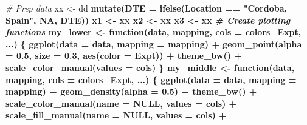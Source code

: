 \documentclass[
]{article}
\newenvironment{Shaded}{\begin{snugshade}}{\end{snugshade}}
\newcommand{\CommentTok}[1]{\textcolor[rgb]{0.56,0.35,0.01}{\textit{#1}}}
\newcommand{\ControlFlowTok}[1]{\textcolor[rgb]{0.13,0.29,0.53}{\textbf{#1}}}
\newcommand{\DataTypeTok}[1]{\textcolor[rgb]{0.13,0.29,0.53}{#1}}
\newcommand{\FloatTok}[1]{\textcolor[rgb]{0.00,0.00,0.81}{#1}}
\newcommand{\KeywordTok}[1]{\textcolor[rgb]{0.13,0.29,0.53}{\textbf{#1}}}
\newcommand{\NormalTok}[1]{#1}
\newcommand{\OperatorTok}[1]{\textcolor[rgb]{0.81,0.36,0.00}{\textbf{#1}}}
\newcommand{\OtherTok}[1]{\textcolor[rgb]{0.56,0.35,0.01}{#1}}
\newcommand{\StringTok}[1]{\textcolor[rgb]{0.31,0.60,0.02}{#1}}
\begin{document}
\begin{Shaded}
\begin{Highlighting}[]
\CommentTok{# Prep data}
\NormalTok{xx <-}\StringTok{ }\NormalTok{dd }\OperatorTok{%
\StringTok{  }\KeywordTok{mutate}\NormalTok{(}\DataTypeTok{DTE =} \KeywordTok{ifelse}\NormalTok{(Location }\OperatorTok{==}\StringTok{ "Cordoba, Spain"}\NormalTok{, }\OtherTok{NA}\NormalTok{, DTE))}
\NormalTok{x1 <-}\StringTok{ }\NormalTok{xx }\OperatorTok{%
\NormalTok{x2 <-}\StringTok{ }\NormalTok{xx }\OperatorTok{%
\NormalTok{x3 <-}\StringTok{ }\NormalTok{xx }\OperatorTok{%
\CommentTok{# Create plotting functions}
\NormalTok{my_lower <-}\StringTok{ }\ControlFlowTok{function}\NormalTok{(data, mapping, }\DataTypeTok{cols =}\NormalTok{ colors_Expt, ...) \{}
  \KeywordTok{ggplot}\NormalTok{(}\DataTypeTok{data =}\NormalTok{ data, }\DataTypeTok{mapping =}\NormalTok{ mapping) }\OperatorTok{+}
\StringTok{    }\KeywordTok{geom_point}\NormalTok{(}\DataTypeTok{alpha =} \FloatTok{0.5}\NormalTok{, }\DataTypeTok{size =} \FloatTok{0.3}\NormalTok{, }\KeywordTok{aes}\NormalTok{(}\DataTypeTok{color =}\NormalTok{ Expt)) }\OperatorTok{+}
\StringTok{    }\KeywordTok{theme_bw}\NormalTok{() }\OperatorTok{+}\StringTok{ }
\StringTok{    }\KeywordTok{scale_color_manual}\NormalTok{(}\DataTypeTok{values =}\NormalTok{ cols)}
\NormalTok{\}}
\NormalTok{my_middle <-}\StringTok{ }\ControlFlowTok{function}\NormalTok{(data, mapping, }\DataTypeTok{cols =}\NormalTok{ colors_Expt, ...) \{}
  \KeywordTok{ggplot}\NormalTok{(}\DataTypeTok{data =}\NormalTok{ data, }\DataTypeTok{mapping =}\NormalTok{ mapping) }\OperatorTok{+}\StringTok{ }
\StringTok{    }\KeywordTok{geom_density}\NormalTok{(}\DataTypeTok{alpha =} \FloatTok{0.5}\NormalTok{) }\OperatorTok{+}\StringTok{ }\KeywordTok{theme_bw}\NormalTok{() }\OperatorTok{+}
\StringTok{    }\KeywordTok{scale_color_manual}\NormalTok{(}\DataTypeTok{name =} \OtherTok{NULL}\NormalTok{, }\DataTypeTok{values =}\NormalTok{ cols) }\OperatorTok{+}
\StringTok{    }\KeywordTok{scale_fill_manual}\NormalTok{(}\DataTypeTok{name =} \OtherTok{NULL}\NormalTok{, }\DataTypeTok{values =}\NormalTok{ cols) }\OperatorTok{+}
}}}}
\end{Highlighting}
\end{Shaded}
\end{document}
